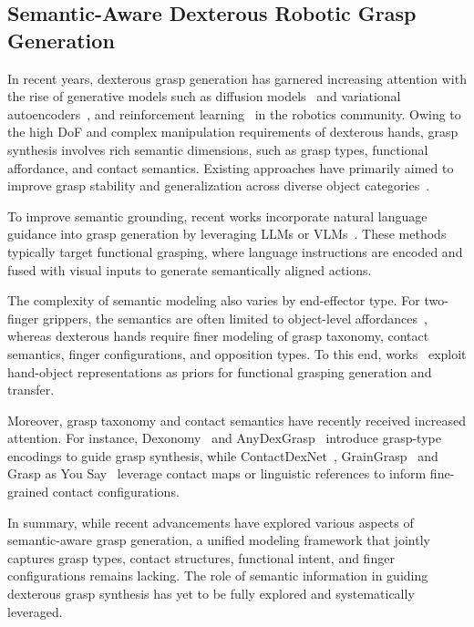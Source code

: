 \subsection{Semantic-Aware Dexterous Robotic Grasp Generation}

In recent years, dexterous grasp generation has garnered increasing attention with the rise of generative models such as diffusion models~\cite{weng2024dexdiffuser,liu2025ifg,wang2024tooleenet} and variational autoencoders~\cite{zhang2024contactdexnet}, and reinforcement learning~\cite{lum2024dextrah,qi2023general} in the robotics community. Owing to the high DoF and complex manipulation requirements of dexterous hands, grasp synthesis involves rich semantic dimensions, such as grasp types, functional affordance, and contact semantics. Existing approaches have primarily aimed to improve grasp stability and generalization across diverse object categories~\cite{zhong2025dexgrasp,wang2022dexgraspnet}.

To improve semantic grounding, recent works incorporate natural language guidance into grasp generation by leveraging LLMs or VLMs~\cite{li2024semgrasp,li2024multi}. These methods typically target functional grasping, where language instructions are encoded and fused with visual inputs to generate semantically aligned actions. 


The complexity of semantic modeling also varies by end-effector type. For two-finger grippers, the semantics are often limited to object-level affordances~\cite{tang2023graspgpt,tang2025foundationgrasp}, whereas dexterous hands require finer modeling of grasp taxonomy, contact semantics, finger configurations, and opposition types. To this end, works~\cite{zhang2023functionalgrasp,wang2025scaleadfg,wu2024cross} exploit hand-object representations as priors for functional grasping generation and transfer.



Moreover, grasp taxonomy and contact semantics have recently received increased attention. For instance, Dexonomy~\cite{chen2025dexonomy} and AnyDexGrasp~\cite{fang2025anydexgrasp} introduce grasp-type encodings to guide grasp synthesis, while ContactDexNet~\cite{zhang2024contactdexnet}, GrainGrasp~\cite{zhao2024graingrasp} and Grasp as You Say~\cite{wei2024grasp} leverage contact maps or linguistic references to inform fine-grained contact configurations.



In summary, while recent advancements have explored various aspects of semantic-aware grasp generation, a unified modeling framework that jointly captures grasp types, contact structures, functional intent, and finger configurations remains lacking. The role of semantic information in guiding dexterous grasp synthesis has yet to be fully explored and systematically leveraged.



